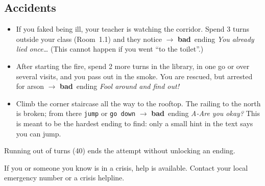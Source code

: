 \documentclass[11pt, a4paper]{article}
\newcommand{\cmd}[1]{\texttt{#1}}
\newcommand{\bad}{\textcolor{alarm}{\textbf{bad}}}
\begin{document}
\subsection*{Accidents}
\begin{itemize}
  \item If you faked being ill, your teacher is watching the corridor. Spend 3 turns outside
        your class (Room~1.1) and they notice $\to$ \bad\ ending \emph{You already lied once\dots}
        (This cannot happen if you went ``to the toilet''.)
  \item After starting the fire, spend 2 more turns in the library, in one go or over several
        visits, and you pass out in the smoke. You are rescued, but arrested for arson
        $\to$ \bad\ ending \emph{Fool around and find out!}
  \item Climb the corner staircase all the way to the rooftop. The railing to the north is
        broken; from there \cmd{jump} or \cmd{go down} $\to$ \bad\ ending \emph{A-Are you okay?}
        This is meant to be the hardest ending to find: only a small hint in the text says you
        can jump.
\end{itemize}

\noindent Running out of turns (40) ends the attempt without unlocking an ending.

\vfill
\noindent\small\textcolor{black!60}{If you or someone you know is in a crisis, help is available.
Contact your local emergency number or a crisis helpline.}
\end{document}
